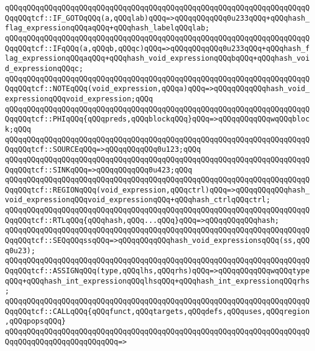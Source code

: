 \verb|qQQqqQQqqQQqqQQqqQQqqQQqqQQqqQQqqQQqqQQqqQQqqQQqqQQqqQQqqQQqqQQqqQQqqQQqqQQqtcf::IF_GOTOqQQq(a,qQQqlab)qQQq=>qQQqqQQqqQQq0u233qQQq+qQQqhash_flag_expressionqQQqaqQQq+qQQqhash_labelqQQqlab;|\newline
\verb|qQQqqQQqqQQqqQQqqQQqqQQqqQQqqQQqqQQqqQQqqQQqqQQqqQQqqQQqqQQqqQQqqQQqqQQqqQQqtcf::IFqQQq(a,qQQqb,qQQqc)qQQq=>qQQqqQQqqQQq0u233qQQq+qQQqhash_flag_expressionqQQqaqQQq+qQQqhash_void_expressionqQQqbqQQq+qQQqhash_void_expressionqQQqc;|\newline
\verb|qQQqqQQqqQQqqQQqqQQqqQQqqQQqqQQqqQQqqQQqqQQqqQQqqQQqqQQqqQQqqQQqqQQqqQQqqQQqtcf::NOTEqQQq(void_expression,qQQqa)qQQq=>qQQqqQQqqQQqhash_void_expressionqQQqvoid_expression;qQQq|\newline
\verb|qQQqqQQqqQQqqQQqqQQqqQQqqQQqqQQqqQQqqQQqqQQqqQQqqQQqqQQqqQQqqQQqqQQqqQQqqQQqtcf::PHIqQQq{qQQqpreds,qQQqblockqQQq}qQQq=>qQQqqQQqqQQqwqQQqblock;qQQq|\newline
\verb|qQQqqQQqqQQqqQQqqQQqqQQqqQQqqQQqqQQqqQQqqQQqqQQqqQQqqQQqqQQqqQQqqQQqqQQqqQQqtcf::SOURCEqQQq=>qQQqqQQqqQQq0u123;qQQq|\newline
\verb|qQQqqQQqqQQqqQQqqQQqqQQqqQQqqQQqqQQqqQQqqQQqqQQqqQQqqQQqqQQqqQQqqQQqqQQqqQQqtcf::SINKqQQq=>qQQqqQQqqQQq0u423;qQQq|\newline
\verb|qQQqqQQqqQQqqQQqqQQqqQQqqQQqqQQqqQQqqQQqqQQqqQQqqQQqqQQqqQQqqQQqqQQqqQQqqQQqtcf::REGIONqQQq(void_expression,qQQqctrl)qQQq=>qQQqqQQqqQQqhash_void_expressionqQQqvoid_expressionqQQq+qQQqhash_ctrlqQQqctrl;|\newline
\verb|qQQqqQQqqQQqqQQqqQQqqQQqqQQqqQQqqQQqqQQqqQQqqQQqqQQqqQQqqQQqqQQqqQQqqQQqqQQqtcf::RTLqQQq{qQQqhash,qQQq...qQQq}qQQq=>qQQqqQQqqQQqhash;|\newline
\verb|qQQqqQQqqQQqqQQqqQQqqQQqqQQqqQQqqQQqqQQqqQQqqQQqqQQqqQQqqQQqqQQqqQQqqQQqqQQqtcf::SEQqQQqssqQQq=>qQQqqQQqqQQqhash_void_expressionsqQQq(ss,qQQq0u23);|\newline
\verb|qQQqqQQqqQQqqQQqqQQqqQQqqQQqqQQqqQQqqQQqqQQqqQQqqQQqqQQqqQQqqQQqqQQqqQQqqQQqtcf::ASSIGNqQQq(type,qQQqlhs,qQQqrhs)qQQq=>qQQqqQQqqQQqwqQQqtypeqQQq+qQQqhash_int_expressionqQQqlhsqQQq+qQQqhash_int_expressionqQQqrhs;|\newline
\newline
\verb|qQQqqQQqqQQqqQQqqQQqqQQqqQQqqQQqqQQqqQQqqQQqqQQqqQQqqQQqqQQqqQQqqQQqqQQqqQQqtcf::CALLqQQq{qQQqfunct,qQQqtargets,qQQqdefs,qQQquses,qQQqregion,qQQqpopsqQQq}|\newline
\verb|qQQqqQQqqQQqqQQqqQQqqQQqqQQqqQQqqQQqqQQqqQQqqQQqqQQqqQQqqQQqqQQqqQQqqQQqqQQqqQQqqQQqqQQqqQQqqQQq=>|\newline
